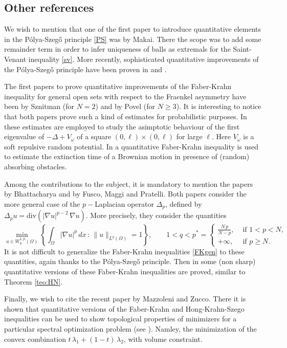 \documentclass{amsart}
\theoremstyle{definition}
\numberwithin{equation}{section}
\begin{document}
\subsection{Other references}
\label{sec:71}
We wish to mention that one of the first paper to introduce quantitative elements in the P\'olya-Szeg\H{o} principle \eqref{PS} was \cite{MR0202053} by Makai. There the scope was to add some remainder term in order to infer uniqueness of balls as extremals for the Saint-Venant inequality \eqref{sv}. More recently, sophisticated quantitative improvements of the P\'olya-Szeg\H{o} principle have been proven in \cite{MR3250365} and \cite{MR2376285}. 
\par
The first papers to prove quantitative improvements of the Faber-Krahn inequality for general open sets with respect to the Fraenkel asymmetry have been \cite{MR1480023} by Sznitman (for $N=2$) and \cite{MR1701519} by Povel (for $N\ge 3$). It is interesting to notice that both papers prove such a kind of estimates for probabilistic purposes. In \cite{MR1480023} these estimates are employed to study the asimptotic behaviour of the first eigenvalue of $-\Delta+V_\omega$ of a square $(0,\ell)\times(0,\ell)$ for large $\ell$. Here $V_\omega$ is a soft repulsive random potential. In \cite{MR1701519} a quantitative Faber-Krahn inequality is used to estimate the extinction time of a Brownian motion in presence of (random) absorbing obstacles.
\par
Among the contributions to the subject, it is mandatory to mention the papers \cite{MR1836803} by Bhattacharya and \cite{MR2512200} by Fusco, Maggi and Pratelli. Both papers consider the more general case of the $p-$Laplacian operator $\Delta_p$, defined by $\Delta_p u=\mathrm{div}(|\nabla u|^{p-2}\,\nabla u)$. More precisely, they consider the quantities
\[
\min_{u\in W^{1,p}_0(\Omega)}\left\{\int_\Omega |\nabla u|^p\,dx\, :\, \|u\|_{L^q(\Omega)}=1\right\},\qquad 1<q<p^*=\left\{\begin{array}{rl}
\displaystyle\frac{N\,p}{N-p},& \mbox{ if } 1<p<N,\\
+\infty, & \mbox{ if }p\ge N.
\end{array}\right.
\]
It is not difficult to generalize the Faber-Krahn inequalities \eqref{FKgen} to these quantities, again thanks to the P\'olya-Szeg\H{o} principle.
Then in \cite{MR1836803, MR2512200} some (non sharp) quantitative versions of these Faber-Krahn inequalities are proved, similar to Theorem \ref{teo:HN}.
\par 
Finally, we wish to cite the recent paper \cite{1512.00993} by Mazzoleni and Zucco. There it is shown that quantitative versions of the Faber-Krahn and Hong-Krahn-Szego inequalities can be used to show topological properties of minimizers for a particular spectral optimization problem (see \cite[Theorem 1.2]{1512.00993}). Namley, the minimization of the convex combination $t\,\lambda_1+(1-t)\,\lambda_2$, with volume constraint. 
\end{document}
